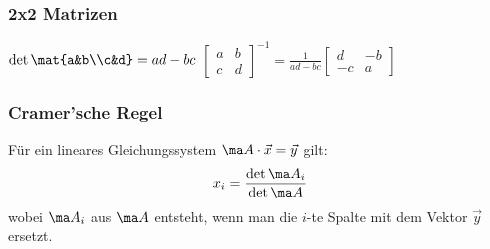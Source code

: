 \documentclass[fs, footer]{latex4ei}
\begin{document}
\begin{multicols*}{4}
{    \subsubsection{2x2 Matrizen}
    $\det\mat{a&b\\c&d} = ad-bc$\qquad
    $\begin{bmatrix}
            a & b \\c&d
        \end{bmatrix}^{-1} =\frac{1}{ad-bc} \begin{bmatrix}
            d & -b \\-c&a
        \end{bmatrix}$

    \subsubsection{Cramer'sche Regel}
    Für ein lineares Gleichungssystem $\ma A \cdot \vec x = \vec y$ gilt:
    \[x_i=\frac{\det \ma A_i}{\det \ma A}\]
    wobei $\ma A_i$ aus $\ma A$ entsteht, wenn man die $i$-te Spalte mit dem Vektor $\vec y$ ersetzt.
    }



\end{multicols*}
\end{document}
